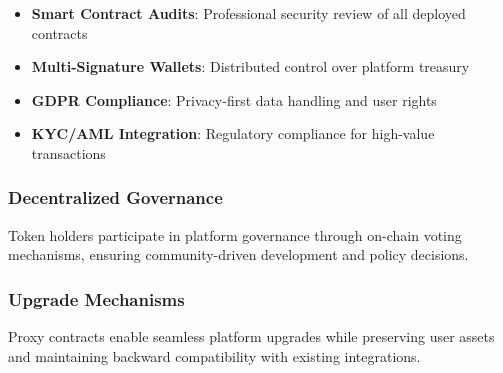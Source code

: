 \begin{itemize}
    \item \textbf{Smart Contract Audits}: Professional security review of all deployed contracts
    \item \textbf{Multi-Signature Wallets}: Distributed control over platform treasury
    \item \textbf{GDPR Compliance}: Privacy-first data handling and user rights
    \item \textbf{KYC/AML Integration}: Regulatory compliance for high-value transactions
\end{itemize}

\subsubsection{Decentralized Governance}

Token holders participate in platform governance through on-chain voting mechanisms, ensuring community-driven development and policy decisions.

\subsubsection{Upgrade Mechanisms}

Proxy contracts enable seamless platform upgrades while preserving user assets and maintaining backward compatibility with existing integrations.